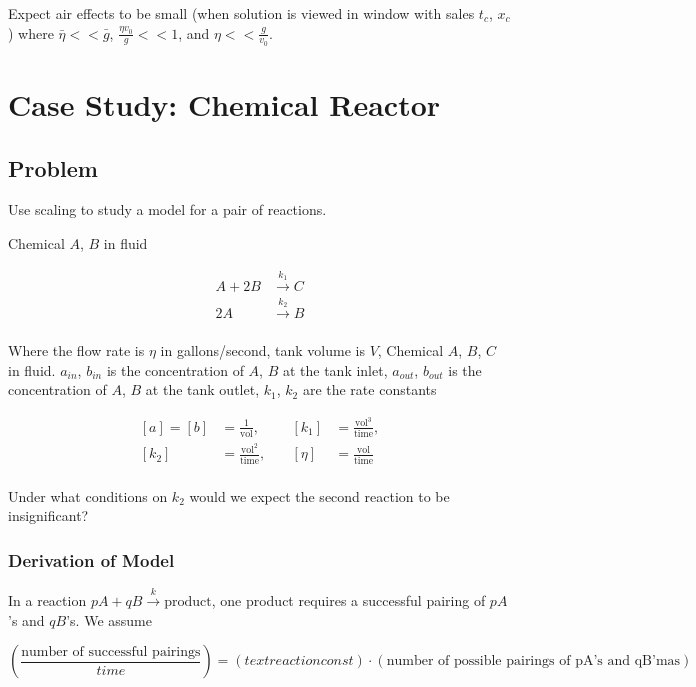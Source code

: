 \documentclass[12pt]{article}
\begin{document}
Expect air effects to be small (when solution is viewed in window with sales
$t_c$, $x_c$) where $\bar{\eta} << \bar{g}$, $\frac{\eta v_0}{g} << 1$, and
$\eta << \frac{g}{v_0}$.

\section{Case Study: Chemical Reactor}
\subsection{Problem}
Use scaling to study a model for a pair of reactions.

Chemical $A$, $B$ in fluid

\begin{equation}
  \begin{aligned}
    A + 2B &\xrightarrow{k_1} C \\
    2A &\xrightarrow{k_2} B \\
  \end{aligned}
\end{equation}

Where the flow rate is $\eta$ in gallons/second, tank volume is $V$, Chemical
$A$, $B$, $C$ in fluid. $a_{in}$, $b_{in}$ is the concentration of $A$, $B$ at
the tank inlet, $a_{out}$, $b_{out}$ is the concentration of $A$, $B$ at the
tank outlet, $k_1$, $k_2$ are the rate constants

\begin{equation}
  \begin{aligned}
    [a]=[b]&=\frac{1}{\text{vol}}, &\quad [k_1]&=\frac{\text{vol}^3}{\text{time}}, \\
    [k_2]&=\frac{\text{vol}^2}{\text{time}}, &\quad [\eta]&=\frac{\text{vol}}{\text{time}} \\
  \end{aligned}
\end{equation}

Under what conditions on $k_2$ would we expect the second reaction to be insignificant?

\subsubsection{Derivation of Model}

In a reaction $pA+qB \xrightarrow{k} \text{product}$, one product requires a
successful pairing of $pA$'s and $qB$'s. We assume

\begin{equation}
  \left(\frac{\text{number of successful pairings}}{time}\right) = \left(text{reaction const}\right)\cdot
  \left(\text{number of possible pairings of pA's and qB'mas}\right)
\end{equation}
\end{document}
